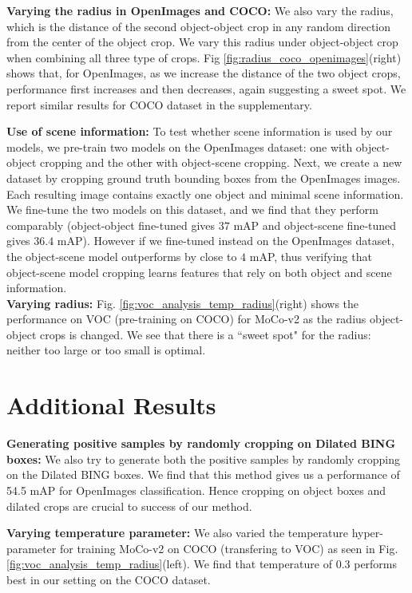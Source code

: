 \textbf{Varying the radius in OpenImages and COCO:} We also vary the radius, which is the distance of the second object-object crop in any random direction from the center of the object crop. We vary this radius under object-object crop when combining all three type of crops. Fig \ref{fig:radius_coco_openimages}(right) shows that, for OpenImages, as we increase the distance of the two object crops, performance first increases and then decreases, again suggesting a sweet spot. We report similar results for COCO dataset in the supplementary.


\textbf{Use of scene information:} To test whether scene information is used by our models, we pre-train two models on the OpenImages dataset: one with object-object cropping and the other with object-scene cropping. Next, we create a new dataset by cropping ground truth bounding boxes from the OpenImages images. Each resulting image contains exactly one object and minimal scene information. We fine-tune the two models on this dataset, and we find that they perform comparably (object-object fine-tuned gives $37$ mAP and object-scene fine-tuned gives $36.4$ mAP). However if we fine-tuned instead on the OpenImages dataset, the object-scene model outperforms by close to $4$ mAP, thus verifying that object-scene model cropping learns features that rely on both object and scene information. \\

\textbf{Varying radius:} Fig. \ref{fig:voc_analysis_temp_radius}(right) shows the performance on VOC (pre-training on COCO) for MoCo-v2 as the radius object-object crops is changed. We see that there is a ``sweet spot" for the radius: neither too large or too small is optimal.


\section{Additional Results}

\textbf{Generating positive samples by randomly cropping on Dilated BING boxes:}
We also try to generate both the positive samples by randomly cropping on the Dilated BING boxes. We find that this method gives us a performance of 54.5 mAP for OpenImages classification. Hence cropping on object boxes and dilated crops are crucial to success of our method.

\textbf{Varying temperature parameter:} We also varied the temperature hyper-parameter for training MoCo-v2 on COCO (transfering to VOC) as seen in Fig. \ref{fig:voc_analysis_temp_radius}(left). We find that temperature of $0.3$ performs best in our setting on the COCO dataset.

